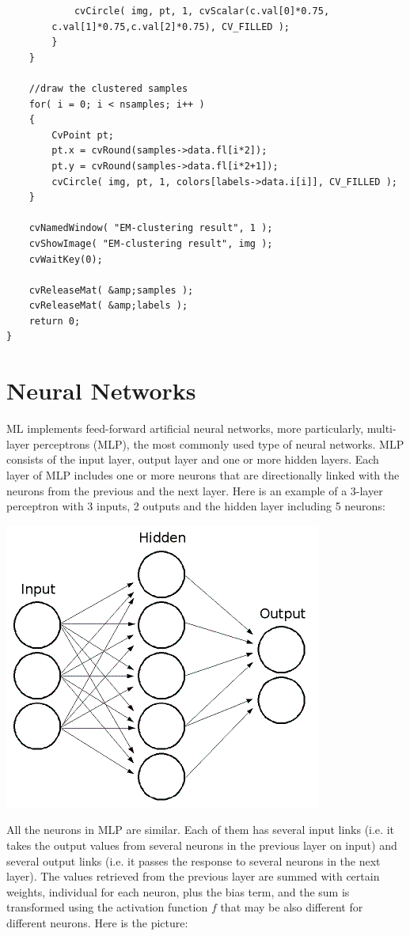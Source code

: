 \begin{lstlisting}
            cvCircle( img, pt, 1, cvScalar(c.val[0]*0.75,
		c.val[1]*0.75,c.val[2]*0.75), CV_FILLED );
        }
    }

    //draw the clustered samples
    for( i = 0; i < nsamples; i++ )
    {
        CvPoint pt;
        pt.x = cvRound(samples->data.fl[i*2]);
        pt.y = cvRound(samples->data.fl[i*2+1]);
        cvCircle( img, pt, 1, colors[labels->data.i[i]], CV_FILLED );
    }

    cvNamedWindow( "EM-clustering result", 1 );
    cvShowImage( "EM-clustering result", img );
    cvWaitKey(0);

    cvReleaseMat( &amp;samples );
    cvReleaseMat( &amp;labels );
    return 0;
}

\end{lstlisting}

\section{Neural Networks}

ML implements feed-forward artificial neural networks, more particularly, multi-layer perceptrons (MLP), the most commonly used type of neural networks. MLP consists of the input layer, output layer and one or more hidden layers. Each layer of MLP includes one or more neurons that are directionally linked with the neurons from the previous and the next layer. Here is an example of a 3-layer perceptron with 3 inputs, 2 outputs and the hidden layer including 5 neurons:

\includegraphics{pics/mlp_.png}

All the neurons in MLP are similar. Each of them has several input links (i.e. it takes the output values from several neurons in the previous layer on input) and several output links (i.e. it passes the response to several neurons in the next layer). The values retrieved from the previous layer are summed with certain weights, individual for each neuron, plus the bias term, and the sum is transformed using the activation function $f$ that may be also different for different neurons. Here is the picture:

